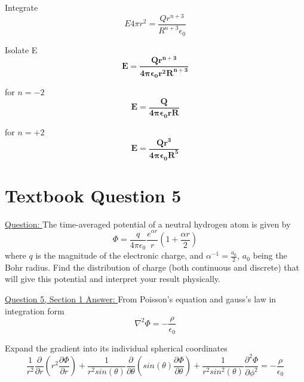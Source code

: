 \documentclass[English]{article}
\begin{document}
    Integrate
    \begin{equation} \label{eq: 4-18}
        E 4 \pi r^2 = \frac{Q r^{n+3}}{R^{n+3} \epsilon_0}
    \end{equation}

    Isolate E
    \begin{equation} \label{eq: 4-19}
        \boxed{\boldsymbol{E = \frac{Q r^{n+3}}{4 \pi \epsilon_0 r^2 R^{n+3}}}}
    \end{equation}

    for $n=-2$
    \begin{equation} \label{eq: 4-20}
        \boxed{\boldsymbol{E = \frac{Q}{4 \pi \epsilon_0 r R}}}
    \end{equation}

    for $n=+2$
    \begin{equation} \label{eq: 4-20}
        \boxed{\boldsymbol{E = \frac{Q r^3}{4 \pi \epsilon_0 R^5}}}
    \end{equation}

\newpage
\section{Textbook Question 5} \label{section5}
    \underline{Question: }
    \newline The time-averaged potential of a neutral hydrogen atom is given by 
    \begin{equation}
        \Phi = \frac{q}{4 \pi \epsilon_0} \frac{e^{\alpha r}}{r} (1 + \frac{\alpha r}{2})
    \end{equation}
    where $q$ is the magnitude of the electronic charge, and $\alpha^{-1} = \frac{a_0}{2}$, $a_0$ being the Bohr radius. Find the distribution of charge (both continuous and discrete) that will give this potential and interpret your result physically.

    \underline{Question 5, Section 1 Answer: }
    \newline \newline From Poisson's equation and gauss's law in integration form
    \begin{equation} \label{eq: 5-1}
        \nabla^2 \Phi = - \frac{\rho}{\epsilon_0}
    \end{equation}

    Expand the gradient into its individual spherical coordinates
    \begin{equation} \label{ea: 5-2}
        \frac{1}{r^2} \frac{\partial}{\partial r} (r^2 \frac{\partial \Phi}{\partial r}) + \frac{1}{r^2 sin(\theta)} \frac{\partial}{\partial \theta} (sin(\theta) \frac{\partial \Phi}{\partial \theta}) + \frac{1}{r^2 sin^2(\theta)} \frac{\partial^2 \Phi}{\partial \phi^2} = - \frac{\rho}{\epsilon_0}
    \end{equation}
\end{document}
